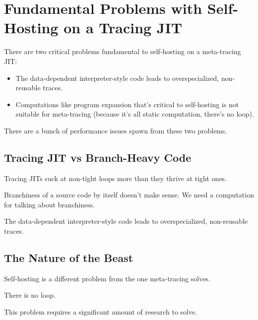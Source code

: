 \chapter{Fundamental Problems with Self-Hosting on a Tracing JIT}

	\begin{chapterpoint}
		There are two critical problems fundamental to self-hosting on a meta-tracing JIT:
		\begin{itemize}
			\item The data-dependent interpreter-style code leads to overspecialized, non-reusable traces.
			\item Computations like program expansion that's critical to self-hosting is not suitable for meta-tracing (because it's all static computation, there's no loop).
		\end{itemize}
		There are a bunch of performance issues spawn from these two problems. 
	\end{chapterpoint}

	\section{Tracing JIT vs Branch-Heavy Code}
		\begin{mainpoint}	
		 	Tracing JITs suck at non-tight loops more than they thrive at tight ones.

			Branchiness of a source code by itself doesn't make sense. We need a computation for talking about branchiness.

			The data-dependent interpreter-style code leads to overspecialized, non-reusable traces.
		\end{mainpoint}

	\section{The Nature of the Beast}
		\begin{mainpoint}
			Self-hosting is a different problem from the one meta-tracing solves.
		
			There is no loop.

			This problem requires a significant amount of research to solve.
		\end{mainpoint}
